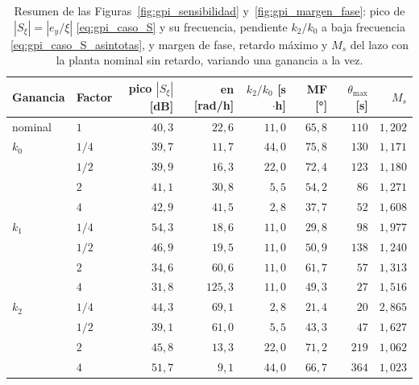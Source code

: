 \begin{table}[H]
\centering
\caption[Sensibilidad y robustez del GPI al variar sus ganancias]{Resumen de
  las Figuras~\ref{fig:gpi_sensibilidad} y~\ref{fig:gpi_margen_fase}: pico de
  $|S_{\xi}| = |e_y/\xi|$ \eqref{eq:gpi_caso_S} y su frecuencia, pendiente $k_2/k_0$
  a baja frecuencia \eqref{eq:gpi_caso_S_asintotas}, y margen de fase, retardo
  máximo y $M_s$ del lazo con la planta nominal sin retardo,
  variando una ganancia a la vez.}
\label{tab:gpi_frecuencia}
\small
\begin{tabular}{llrrrrrr}
\toprule
\textbf{Ganancia} & \textbf{Factor} & pico $|S_{\xi}|$ [dB] & en [rad/h] & $k_2/k_0$ [s$\cdot$h] & MF [°] & $\theta_{\max}$ [s] & $M_s$ \\
\midrule
nominal & $1$ & $40{,}3$ & $22{,}6$ & $11{,}0$ & $65{,}8$ & $110$ & $1{,}202$ \\
\midrule
$k_0$ & $1/4$ & $39{,}7$ & $11{,}7$ & $44{,}0$ & $75{,}8$ & $130$ & $1{,}171$ \\
 & $1/2$ & $39{,}9$ & $16{,}3$ & $22{,}0$ & $72{,}4$ & $123$ & $1{,}180$ \\
 & $2$ & $41{,}1$ & $30{,}8$ & $5{,}5$ & $54{,}2$ & $86$ & $1{,}271$ \\
 & $4$ & $42{,}9$ & $41{,}5$ & $2{,}8$ & $37{,}7$ & $52$ & $1{,}608$ \\
\midrule
$k_1$ & $1/4$ & $54{,}3$ & $18{,}6$ & $11{,}0$ & $29{,}8$ & $98$ & $1{,}977$ \\
 & $1/2$ & $46{,}9$ & $19{,}5$ & $11{,}0$ & $50{,}9$ & $138$ & $1{,}240$ \\
 & $2$ & $34{,}6$ & $60{,}6$ & $11{,}0$ & $61{,}7$ & $57$ & $1{,}313$ \\
 & $4$ & $31{,}8$ & $125{,}3$ & $11{,}0$ & $49{,}3$ & $27$ & $1{,}516$ \\
\midrule
$k_2$ & $1/4$ & $44{,}3$ & $69{,}1$ & $2{,}8$ & $21{,}4$ & $20$ & $2{,}865$ \\
 & $1/2$ & $39{,}1$ & $61{,}0$ & $5{,}5$ & $43{,}3$ & $47$ & $1{,}627$ \\
 & $2$ & $45{,}8$ & $13{,}3$ & $22{,}0$ & $71{,}2$ & $219$ & $1{,}062$ \\
 & $4$ & $51{,}7$ & $9{,}1$ & $44{,}0$ & $66{,}7$ & $364$ & $1{,}023$ \\
\bottomrule
\end{tabular}
\end{table}


